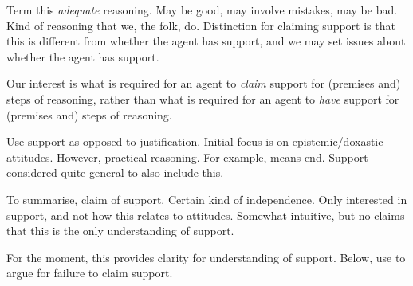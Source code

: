 \begin{note}
  Term this \emph{adequate} reasoning.
  May be good, may involve mistakes, may be bad.
  Kind of reasoning that we, the folk, do.
  Distinction for claiming support is that this is different from whether the agent has support, and we may set issues about whether the agent has support.

  Our interest is what is required for an agent to \emph{claim} support for (premises and) steps of reasoning, rather than what is required for an agent to \emph{have} support for (premises and) steps of reasoning.

  Use support as opposed to justification.
  Initial focus is on epistemic/doxastic attitudes.
  However, practical reasoning.
  For example, means-end.
  Support considered quite general to also include this.
\end{note}

\begin{note}
  To summarise, claim of support.
  Certain kind of independence.
  Only interested in support, and not how this relates to attitudes.
  Somewhat intuitive, but no claims that this is the only understanding of support.

  For the moment, this provides clarity for understanding of support.
  Below, use to argue for failure to claim support.
\end{note}

